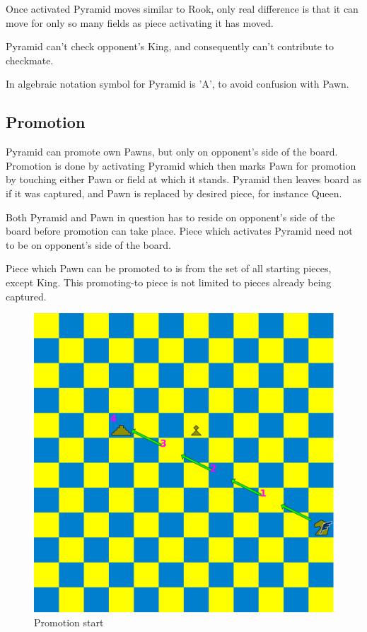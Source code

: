 \documentclass[a5paper,12pt,draft]{book} %
\begin{document}
Once activated Pyramid moves similar to Rook, only real difference is that
it can move for only so many fields as piece activating it has moved.

Pyramid can't check opponent's King, and consequently can't contribute to
checkmate.

In algebraic notation symbol for Pyramid is 'A', to avoid confusion with Pawn.

\subsection*{Promotion}

\indent
Pyramid can promote own Pawns, but only on opponent's side of the board.
Promotion is done by activating Pyramid which then marks Pawn for promotion
by touching either Pawn or field at which it stands. Pyramid then leaves
board as if it was captured, and Pawn is replaced by desired piece, for
instance Queen.

Both Pyramid and Pawn in question has to reside on opponent's side of the
board before promotion can take place. Piece which activates Pyramid need
not to be on opponent's side of the board.

Piece which Pawn can be promoted to is from the set of all starting pieces,
except King. This promoting-to piece is not limited to pieces already being
captured.

\clearpage

\noindent
\begin{figure}[!h]
\includegraphics[width=1.0\textwidth, keepaspectratio=true]{../gfx/examples/04_move_pyramid_promo_init.png}
\caption{Promotion start}
\label{fig:ma_promo_init}
\end{figure}
\end{document}
